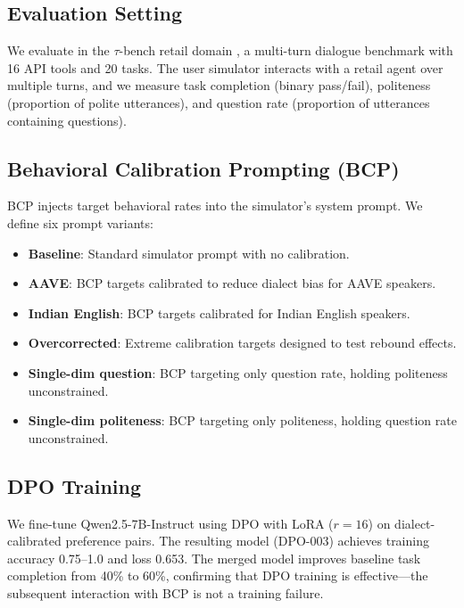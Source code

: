 \documentclass[11pt]{article}
\newcommand{\taubench}{$\tau$-bench}
\begin{document}
\subsection{Evaluation Setting}

We evaluate in the \taubench{} retail domain \citep{yao2024taubench}, a multi-turn dialogue benchmark with 16 API tools and 20 tasks. The user simulator interacts with a retail agent over multiple turns, and we measure task completion (binary pass/fail), politeness (proportion of polite utterances), and question rate (proportion of utterances containing questions).

\subsection{Behavioral Calibration Prompting (BCP)}

BCP injects target behavioral rates into the simulator's system prompt. We define six prompt variants:

\begin{itemize}
    \item \textbf{Baseline}: Standard simulator prompt with no calibration.
    \item \textbf{AAVE}: BCP targets calibrated to reduce dialect bias for AAVE speakers.
    \item \textbf{Indian English}: BCP targets calibrated for Indian English speakers.
    \item \textbf{Overcorrected}: Extreme calibration targets designed to test rebound effects.
    \item \textbf{Single-dim question}: BCP targeting only question rate, holding politeness unconstrained.
    \item \textbf{Single-dim politeness}: BCP targeting only politeness, holding question rate unconstrained.
\end{itemize}

\subsection{DPO Training}

We fine-tune Qwen2.5-7B-Instruct using DPO \citep{rafailov2023dpo} with LoRA ($r=16$) on dialect-calibrated preference pairs. The resulting model (DPO-003) achieves training accuracy 0.75--1.0 and loss 0.653. The merged model improves baseline task completion from 40\% to 60\%, confirming that DPO training is effective---the subsequent interaction with BCP is not a training failure.
\end{document}

